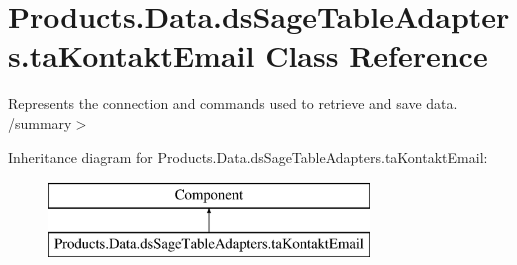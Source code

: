 \hypertarget{class_products_1_1_data_1_1ds_sage_table_adapters_1_1ta_kontakt_email}{}\section{Products.\+Data.\+ds\+Sage\+Table\+Adapters.\+ta\+Kontakt\+Email Class Reference}
\label{class_products_1_1_data_1_1ds_sage_table_adapters_1_1ta_kontakt_email}


Represents the connection and commands used to retrieve and save data. /summary$>$  


Inheritance diagram for Products.\+Data.\+ds\+Sage\+Table\+Adapters.\+ta\+Kontakt\+Email\+:\begin{figure}[H]
\begin{center}
\leavevmode
\includegraphics[height=2.000000cm]{class_products_1_1_data_1_1ds_sage_table_adapters_1_1ta_kontakt_email}
\end{center}
\end{figure}
